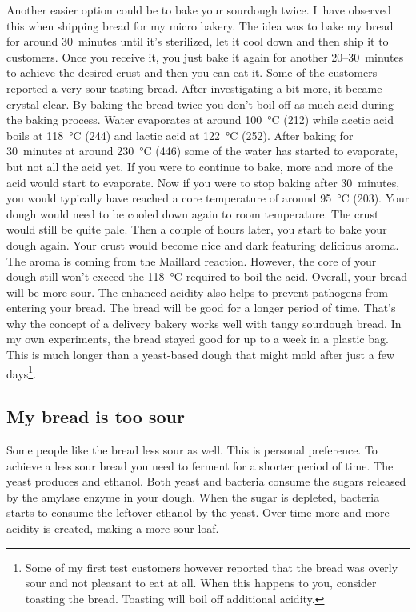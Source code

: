 Another easier option could be to bake your sourdough
twice. I~have observed this when shipping bread for my micro
bakery. The idea was to bake my bread for around 30~minutes
until it's sterilized, let it cool down and then ship it
to customers. Once you receive it, you just bake it again
for another 20--30~minutes to achieve the desired crust and
then you can eat it. Some of the customers reported a very sour
tasting bread. After investigating a bit more, it became
crystal clear. By baking the bread twice you don't boil off
as much acid during the baking process. Water
evaporates at around \qty{100}{\degreeCelsius} (\qty{212}{\degF}) while acetic
acid boils at \qty{118}{\degreeCelsius} (\qty{244}{\degF}) and lactic acid at
\qty{122}{\degreeCelsius} (\qty{252}{\degF}). After baking for 30~minutes at
around  \qty{230}{\degreeCelsius} (\qty{446}{\degF}) some of the water has
started to evaporate, but not all the acid yet. If you were to continue to
bake, more and more of the acid would start to evaporate. Now if you were to
stop baking after 30~minutes, you would typically have reached a core
temperature of around \qty{95}{\degreeCelsius} (\qty{203}{\degF}).  Your dough
would need
to be cooled down again to room temperature. The crust would
still be quite pale. Then a couple of hours later, you start
to bake your dough again. Your crust would become nice and
dark featuring delicious aroma. The aroma is coming from the
Maillard reaction. However, the core of your dough still won't
exceed the \qty{118}{\degreeCelsius} required to boil the acid. Overall, your
bread will be more sour. The enhanced acidity also helps
to prevent pathogens from entering your bread. The bread
will be good for a longer period of time. That's why
the concept of a delivery bakery works well with tangy sourdough bread.
In my own experiments, the bread stayed good for up to a week
in a plastic bag. This is much longer than a yeast-based dough that might
mold after just a few days\footnote{Some of my first test customers however
reported that the bread was overly sour and not pleasant to eat at all.
When this happens to you, consider toasting the bread. Toasting
will boil off additional acidity.}.

\subsection{My bread is too sour}

Some people like the bread less sour as well. This
is personal preference. To achieve a less sour bread
you need to ferment for a shorter period of time.
The yeast produces  and ethanol. Both yeast and
bacteria consume the sugars released by the amylase enzyme
in your dough. When the sugar is depleted, bacteria starts to
consume the leftover ethanol by the yeast. Over time more
and more acidity is created, making a more sour loaf.

